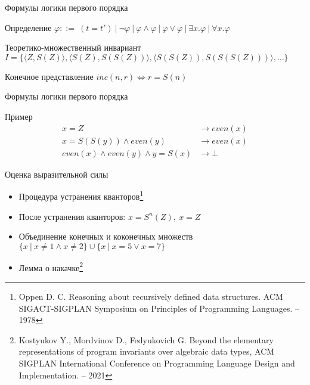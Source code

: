 \documentclass{beamer}
\renewcommand{\phi}{\ensuremath{\varphi}}
\begin{document}
\begin{frame}{Формулы логики первого порядка}
\begin{block}{Определение}
$\phi ::=\ (t = t')\ |\ \neg \phi\ |\ \phi \wedge \phi\ |\ \phi \vee \phi\ |\ \exists x.\phi\ |\ \forall x.\phi$
\end{block}
\pause
\begin{block}{Теоретико-множественный инвариант}
$I = \{\langle Z, S(Z) \rangle, \langle S(Z), S(S(Z)) \rangle, \langle S(S(Z)), S(S(S(Z))) \rangle, \ldots \} $
\end{block}
\begin{block}{Конечное представление}
$inc(n, r) \iff r = S(n)$
\end{block}
\end{frame}

\begin{frame}{Формулы логики первого порядка}
\begin{alertblock}{Пример}
\vspace{-1.7em}
\begin{align*}
    x = Z &\to even(x)\\
x = S(S(y)) \wedge even(y) &\to even(x)\\
even(x) \wedge even(y) \wedge y = S(x) &\to \bot
\end{align*}

\end{alertblock}

Оценка выразительной силы
\begin{itemize}
    \item Процедура устранения кванторов\footnote{Oppen D. C. Reasoning about recursively defined data structures. ACM SIGACT-SIGPLAN Symposium on Principles of Programming Languages. – 1978}
    \pause
    \item После устранения кванторов: $x = S^n(Z),\ x = Z$
    \item Объединение конечных и коконечных множеств $\{x\ |\ x \neq 1 \wedge x \neq 2\} \cup \{x\ |\ x = 5 \vee x = 7\}$
    \pause
    \item Лемма о накачке\footnote{Kostyukov Y., Mordvinov D., Fedyukovich G. Beyond the elementary representations of program invariants over algebraic data types, ACM SIGPLAN International Conference on Programming Language Design and Implementation. – 2021}
\end{itemize}
\end{frame}
\end{document}
